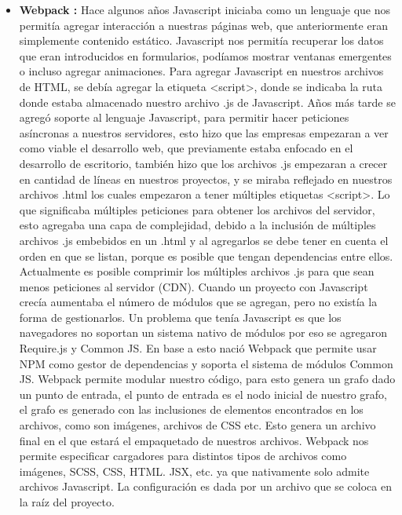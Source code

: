 \begin{itemize}
       \item \textbf{ Webpack :} Hace algunos años Javascript iniciaba como un lenguaje que nos permitía agregar interacción a nuestras páginas web, que anteriormente eran simplemente contenido estático.  Javascript nos permitía recuperar los datos que eran introducidos en formularios, podíamos mostrar ventanas emergentes o incluso agregar animaciones. Para agregar Javascript en nuestros archivos de HTML, se debía agregar la etiqueta <script>, donde se indicaba la ruta donde estaba almacenado nuestro archivo .js de Javascript.  
    Años más tarde se agregó soporte al lenguaje Javascript, para permitir hacer peticiones asíncronas a nuestros servidores, esto hizo que las empresas empezaran a ver como viable el desarrollo web, que previamente estaba enfocado en el desarrollo de escritorio, también hizo que los archivos .js empezaran a crecer en cantidad de líneas en nuestros proyectos, y se miraba reflejado en nuestros archivos .html los cuales empezaron a tener múltiples etiquetas <script>. Lo que significaba múltiples peticiones para obtener los archivos del servidor, esto agregaba una capa de complejidad, debido a la inclusión de múltiples archivos .js embebidos en un .html y al agregarlos se debe tener en cuenta el orden en que se listan, porque es posible que tengan dependencias entre ellos. Actualmente es posible comprimir los múltiples archivos .js para que sean menos peticiones al servidor (CDN).  Cuando un proyecto con Javascript crecía aumentaba el número de módulos que se agregan, pero no existía la forma de gestionarlos. Un problema que tenía Javascript es que los navegadores no soportan un sistema nativo de módulos por eso se agregaron Require.js y Common JS. 
    En base a esto nació Webpack \cite{webPack} que permite usar NPM como gestor de dependencias y soporta el sistema de módulos Common JS.
    Webpack permite modular nuestro código, para esto genera un grafo dado un punto de entrada, el punto de entrada es el nodo inicial de nuestro grafo, el grafo es generado con las inclusiones de elementos encontrados en los archivos, como son imágenes, archivos de CSS etc. Esto genera un archivo final en el que estará el empaquetado de nuestros archivos. 
    Webpack nos permite especificar cargadores para distintos tipos de archivos como imágenes, SCSS, CSS, HTML. JSX, etc. ya que nativamente solo admite archivos Javascript. 
    La configuración es dada por un archivo que se coloca en la raíz del proyecto.
    

\end{itemize}
